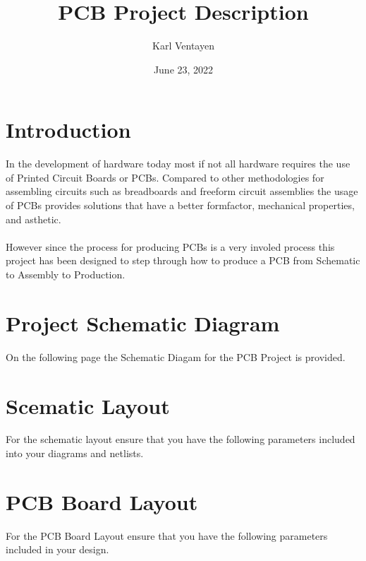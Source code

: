 \documentclass[12pt, letterpaper]{article}
\title{PCB Project Description}
\author{Karl Ventayen}
\date{June 23, 2022}
\begin{document}
\begin{comment}
\begin{titlepage}
    \maketitle
\end{titlepage}
\end{comment}

\maketitle

\tableofcontents{}

\section{Introduction}
In the development of hardware today most if not all hardware requires the use of Printed Circuit Boards or PCBs. Compared to other methodologies for assembling circuits such as breadboards and freeform circuit assemblies the usage of PCBs provides solutions that have a better formfactor, mechanical properties, and asthetic.\\
\\
However since the process for producing PCBs is a very involed process this project has been designed to step through how to produce a PCB from Schematic to Assembly to Production.

\section{Project Schematic Diagram}
On the following page the Schematic Diagam for the PCB Project is provided.


\section{Scematic Layout}
For the schematic layout ensure that you have the following parameters included into your diagrams and netlists.

\section{PCB Board Layout}
For the PCB Board Layout ensure that you have the following parameters included in your design.
\end{document}
